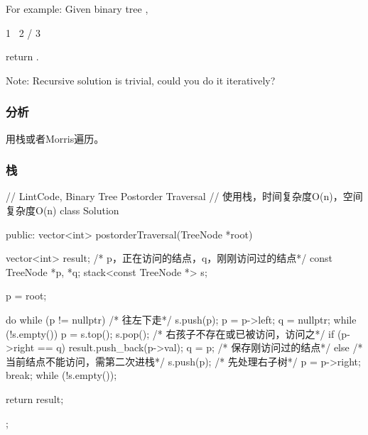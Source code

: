 For example:
Given binary tree ,
\begin{Code}
 1
  \
   2
  /
 3
\end{Code}
return \code{[3,2,1]}.

Note: Recursive solution is trivial, could you do it iteratively?


\subsubsection{分析}
用栈或者Morris遍历。


\subsubsection{栈}
\begin{Code}
// LintCode, Binary Tree Postorder Traversal
// 使用栈，时间复杂度O(n)，空间复杂度O(n)
class Solution {
public:
    vector<int> postorderTraversal(TreeNode *root) {
        vector<int> result;
        /* p，正在访问的结点，q，刚刚访问过的结点*/
        const TreeNode *p, *q;
        stack<const TreeNode *> s;

        p = root;

        do {
            while (p != nullptr) { /* 往左下走*/
                s.push(p);
                p = p->left;
            }
            q = nullptr;
            while (!s.empty()) {
                p = s.top();
                s.pop();
                /* 右孩子不存在或已被访问，访问之*/
                if (p->right == q) {
                    result.push_back(p->val);
                    q = p; /* 保存刚访问过的结点*/
                } else {
                    /* 当前结点不能访问，需第二次进栈*/
                    s.push(p);
                    /* 先处理右子树*/
                    p = p->right;
                    break;
                }
            }
        } while (!s.empty());

        return result;
    }
};
\end{Code}


